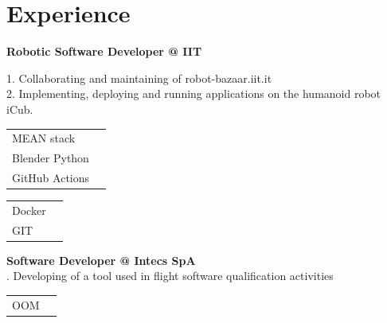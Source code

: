 \documentclass[a4paper,10pt]{article}
\begin{document}
\begin{adjustbox}{valign=t}
\begin{minipage}{0.6\textwidth} %
\section*{Experience}
\begin{description}
\raggedright
\item[\normalfont \textcolor{ColorOne}{Feb. 2020 -- PRESENT}] \textbf{Robotic Software Developer @ IIT}\\ \medskip

1. Collaborating and maintaining of robot-bazaar.iit.it\\
2. Implementing, deploying and running applications on the humanoid robot iCub.
\begin{multicols}{2}
\begin{tabular}{ll}
	MEAN stack 	& \SkillBull{$\bullet \bullet \bullet \, \bullet$}\\
	Blender Python 	& \SkillBull{$\bullet \bullet \circ \, \circ$}\\
	GitHub Actions 	& \SkillBull{$\bullet \bullet \bullet \, \bullet$}\\
\end{tabular}

\vfill\null \columnbreak  %

\begin{tabular}{ll}
	Docker 	& \SkillBull{$\bullet \bullet \bullet \, \circ$}\\
	GIT 	& \SkillBull{$\bullet \bullet \bullet \, \bullet$}\\

\end{tabular}
\end{multicols}

\end{description}

\begin{description}
\raggedright
\item[\normalfont \textcolor{ColorOne}{Jun. 2019 -- Jan. 2020}] 
	\textbf{Software Developer @ Intecs SpA}\\ . Developing of a tool used in flight software qualification activities
\begin{multicols}{2}
\begin{tabular}{ll}
	OOM 	& \SkillBull{$\bullet \bullet \bullet \, \bullet$}\\
\end{tabular}


\end{multicols}
\end{description}
\end{minipage}
\end{adjustbox}
\end{document}
